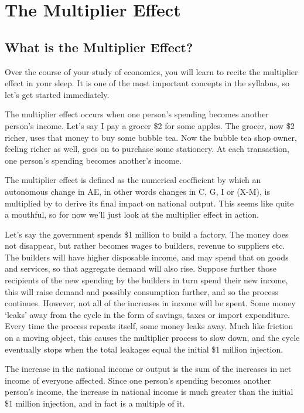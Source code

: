 \section{The Multiplier Effect}
\subsection{What is the Multiplier Effect?}
Over the course of your study of economics, you will learn to recite the multiplier effect in your sleep. It is one of the most important concepts in the syllabus, so let’s get started immediately. 

The multiplier effect occurs when one person’s spending becomes another person’s income. Let’s say I pay a grocer \$2 for some apples. The grocer, now \$2 richer, uses that money to buy some bubble tea. Now the bubble tea shop owner, feeling richer as well, goes on to purchase some stationery. At each transaction, one person’s spending becomes another’s income.

The multiplier effect is defined as the numerical coefficient by which an autonomous change in AE, in other words changes in C, G, I or (X-M), is multiplied by to derive its final impact on national output. This seems like quite a mouthful, so for now we’ll just look at the multiplier effect in action. 

Let’s say the government spends \$1 million to build a factory. The money does not disappear, but rather becomes wages to builders, revenue to suppliers etc. The builders will have higher disposable income, and may spend that on goods and services, so that aggregate demand will also rise. Suppose further those recipients of the new spending by the builders in turn spend their new income, this will raise demand and possibly consumption further, and so the process continues. However, not all of the increases in income will be spent. Some money ‘leaks’ away from the cycle in the form of savings, taxes or import expenditure. Every time the process repeats itself, some money leaks away. Much like friction on a moving object, this causes the multiplier process to slow down, and the cycle eventually stops when the total leakages equal the initial \$1 million injection.

The increase in the national income or output is the sum of the increases in net income of everyone affected. Since one person’s spending becomes another person’s income, the increase in national income is much greater than the initial \$1 million injection, and in fact is a multiple of it. 
